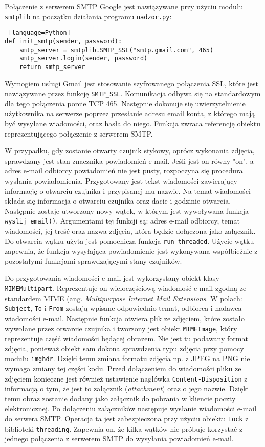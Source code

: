 \documentclass[a4paper,11pt,twoside]{article}
\begin{document}
Połączenie z serwerem SMTP Google jest nawiązywane przy użyciu modułu \texttt{smtplib} na początku działania programu \texttt{nadzor.py}: 
\begin{lstlisting} [language=Python]
def init_smtp(sender, password):
    smtp_server = smtplib.SMTP_SSL("smtp.gmail.com", 465)
    smtp_server.login(sender, password)
    return smtp_server 
\end{lstlisting}
Wymogiem usługi Gmail jest stosowanie szyfrowanego połączenia SSL, które jest nawiązywane przez funkcję \texttt{SMTP{\_}SSL}. Komunikacja odbywa się na standardowym dla tego połączenia porcie TCP 465. Następnie dokonuje się uwierzytelnienie użytkownika na serwerze poprzez przesłanie adresu email konta, z którego mają być wysyłane wiadomości, oraz hasła do niego. Funkcja zwraca referencję obiektu reprezentującego połączenie z serwerem SMTP.

W przypadku, gdy zostanie otwarty czujnik stykowy, oprócz wykonania zdjęcia, sprawdzany jest stan znacznika powiadomień e-mail. Jeśli jest on równy "on", a adres e-mail odbiorcy powiadomień nie jest pusty, rozpoczyna się procedura wysłania powiadomienia. Przygotowany jest tekst wiadomości zawierający informację o otwarciu czujnika i przypisanej mu nazwie. Na temat wiadomości składa się informacja o otwarciu czujnika oraz dacie i godzinie otwarcia. Następnie zostaje utworzony nowy wątek, w którym jest wywoływana funkcja \texttt{wyslij{\_}email()}. Argumentami tej funkcji są: adres e-mail odbiorcy, temat wiadomości, jej treść oraz nazwa zdjęcia, która będzie dołączona jako załącznik. Do otwarcia wątku użyta jest pomocnicza funkcja \texttt{run{\_}threaded}. Użycie wątku zapewnia, że funkcja wysyłająca powiadomienie jest wykonywana współbieżnie z pozostałymi funkcjami sprawdzającymi stany czujników.

Do przygotowania wiadomości e-mail jest wykorzystany obiekt klasy \texttt{MIMEMultipart}. Reprezentuje on wieloczęściową wiadomość e-mail zgodną ze standardem MIME (ang. \textit{Multipurpose Internet Mail Extensions}\cite{mime1}\cite{mime2}.  W polach: \texttt{Subject}, \texttt{To} i \texttt{From} zostają wpisane odpowiednio temat, odbiorca i nadawca wiadomości e-mail. Następnie funkcja otwiera plik ze zdjęciem, które zostało wywołane przez otwarcie czujnika i tworzony jest obiekt \texttt{MIMEImage}, który reprezentuje część wiadomości będącej obrazem. Nie jest tu podawany format zdjęcia, ponieważ obiekt sam dokona sprawdzenia typu zdjęcia przy pomocy modułu \texttt{imghdr}\cite{python-mime}. Dzięki temu zmiana formatu zdjęcia np. z JPEG na PNG nie wymaga zmiany tej części kodu. Przed dołączeniem do wiadomości pliku ze zdjęciem konieczne jest również ustawienie nagłówka \texttt{Content-Disposition} z informacją o tym, że jest to załącznik (\textit{attachment}) oraz o jego nazwie. Dzięki temu obraz zostanie dodany jako załącznik do pobrania w kliencie poczty elektronicznej\cite{content-disposition}. Po dołączeniu załączników następuje wysłanie wiadomości e-mail do serwera SMTP. Operacja ta jest zabezpieczona przy użyciu obiektu \texttt{Lock} z biblioteki \texttt{threading}. Zapewnia on, że kilka wątków nie próbuje korzystać z jednego połączenia z serwerem SMTP do wysyłania powiadomień e-mail.
\newpage
\end{document}
